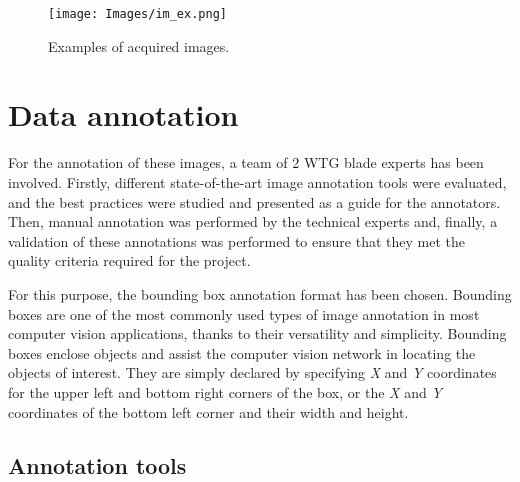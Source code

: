 \begin{figure*}[htbp]
        \centering            
        \texttt{[image: Images/im\_ex.png]}
        \caption[Examples of acquired images.]
        {\small Examples of acquired images.} 
        \label{fig:im_ex}
    \end{figure*}


\section{Data annotation}
\label{sec:dataAnnotation}
For the annotation of these images, a team of 2 WTG blade experts has been involved. Firstly, different state-of-the-art image annotation tools were evaluated, and the best practices were studied and presented as a guide for the annotators. Then, manual annotation was performed by the technical experts and, finally, a validation of these annotations was performed to ensure that they met the quality criteria required for the project.

For this purpose, the bounding box annotation format has been chosen. Bounding boxes are one of the most commonly used types of image annotation in most computer vision applications, thanks to their versatility and simplicity. Bounding boxes enclose objects and assist the computer vision network in locating the objects of interest. They are simply declared by specifying \emph{X} and \emph{Y} coordinates for the upper left and bottom right corners of the box, or the \emph{X} and \emph{Y} coordinates of the bottom left corner and their width and height.

\subsection{Annotation tools}
\label{sec:objectDetectionAlgorithms}

